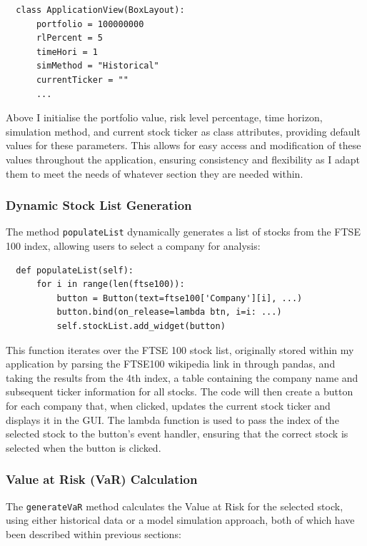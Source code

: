 \documentclass{article}
\begin{document}
\begin{verbatim}
  class ApplicationView(BoxLayout):
      portfolio = 100000000
      rlPercent = 5
      timeHori = 1
      simMethod = "Historical"
      currentTicker = ""
      ...
\end{verbatim}

\vspace{0.3cm}
Above I initialise the portfolio value, risk level percentage, time horizon, simulation method, and current stock ticker as class attributes, providing default values for these parameters. This allows for easy access and modification of these values throughout the application, ensuring consistency and flexibility as I adapt them to meet the needs of whatever section they are needed within.\\\vspace{0.3cm}

\subsubsection{Dynamic Stock List Generation}
The method \texttt{populateList} dynamically generates a list of stocks from the FTSE 100 index, allowing users to select a company for analysis:

\begin{verbatim}
  def populateList(self):
      for i in range(len(ftse100)):
          button = Button(text=ftse100['Company'][i], ...)
          button.bind(on_release=lambda btn, i=i: ...)
          self.stockList.add_widget(button)
\end{verbatim}

\vspace{0.3cm}
This function iterates over the FTSE 100 stock list, originally stored within my application by parsing the FTSE100 wikipedia link in through pandas, and taking the results from the 4th index, a table containing the company name and subsequent ticker information for all stocks. The code will then create a button for each company that, when clicked, updates the current stock ticker and displays it in the GUI. The lambda function is used to pass the index of the selected stock to the button's event handler, ensuring that the correct stock is selected when the button is clicked.\\\vspace{0.3cm}

\subsubsection{Value at Risk (VaR) Calculation}
The \texttt{generateVaR} method calculates the Value at Risk for the selected stock, using either historical data or a model simulation approach, both of which have been described within previous sections:
\end{document}
